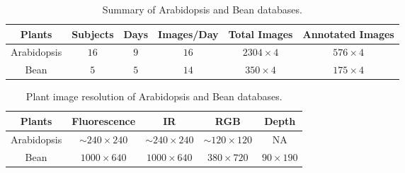 \begin{table*}[t!]
\begin{center}
\caption{Summary of Arabidopsis and Bean databases.}
\label{tab:stat}
\begin{tabular}{c|c|c|c|c|c}
      \hline
      Plants     & Subjects & Days & Images/Day & Total Images & Annotated Images \\
      \hline
      Arabidopsis &  $16$      &  $9$   &     $16$     &     $2304\times 4$     &       $576\times 4$     \\
      \hline
      Bean        &   $5$      &  $5$   &     $14$     &     $350\times 4$       &       $175\times 4$  \\
      \hline
\end{tabular}
\end{center}
\end{table*}



\begin{table*}
\begin{center}
\caption{Plant image resolution of Arabidopsis and Bean databases.}
\label{tab:resolution}
\begin{tabular}{c|c|c|c|c}
      \hline
      Plants     & Fluorescence       & IR        & RGB      & Depth     \\
      \hline
      Arabidopsis &  $\sim$$240\times240$ &  $\sim$$240\times240$  & $\sim$$120\times120$  & NA  \\
      Bean        & $1000\times640$ & $1000\times640$ & $380\times720$ & $90\times190$    \\
      \hline
\end{tabular}
\end{center}
\end{table*}
